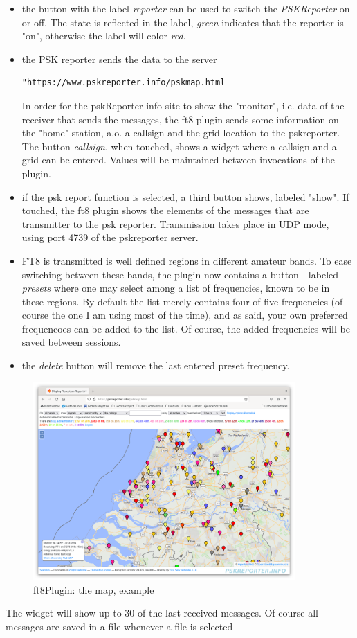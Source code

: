 \documentclass[11pt]{article}
\begin{document}
\begin{itemize}
\item the button with the label {\em reporter} can be used to switch
the {\em PSKReporter} on or off. The state is reflected in the label,
{\em green} indicates that the reporter is "on", otherwise the label
will color {\em red}.
\item the PSK reporter sends the data to the server 
{\footnotesize
\begin{verbatim}
"https://www.pskreporter.info/pskmap.html
\end{verbatim}
}
In order for the pskReporter info site to show the "monitor",
i.e. data of the receiver that sends the messages, the ft8 plugin
sends some information on the "home" station, a.o. a callsign and the 
grid location to the pskreporter.
The button {\em callsign}, when touched, shows a widget
where a callsign and a grid can be entered. Values will be maintained
between invocations of the plugin.
\item if the psk report function is selected, a third button shows,
labeled "show". If touched, the ft8 plugin shows the elements of
the messages  that are transmitter to the psk reporter.
Transmission takes place in UDP mode, using port 4739 of the pskreporter server.
\item FT8 is transmitted is well defined regions in different amateur bands. To
ease  switching between these bands, the plugin now contains a button - labeled
- {\em presets} where one may select among a list of frequencies, known to
be in these regions. By default the list merely contains four of five
frequencies (of course the one I am using most of the time), and as said,
your own preferred frequencoes can be added to the list.
Of course, the added frequencies will be saved between sessions.
\item the {\em delete} button will remove the last entered preset frequency.
\end{itemize}

\begin{figure}[htp]
\centering
\includegraphics[width=100mm]{pskreportermap.png}
\caption{ft8Plugin: the map, example}
\label{figure:pskReportermap}
\end{figure}
\par
The widget will show up to 30 of the last received messages. Of course
all messages are saved in a file whenever a file is selected
\end{document}
